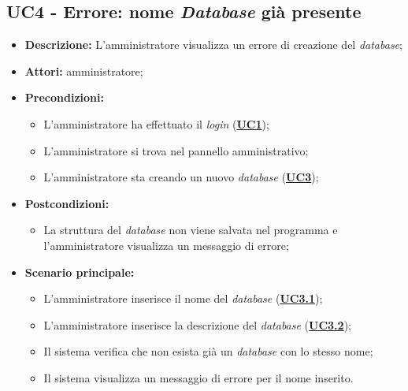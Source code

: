 \subsection{UC4 - Errore: nome \textit{Database} già presente}
\label{sec:UC4}
\begin{itemize}
	\item \textbf{Descrizione:} L’amministratore visualizza un errore di creazione del \textit{database};
	\item \textbf{Attori:} amministratore;
	\item \textbf{Precondizioni:} 
	\begin{itemize}
		\item L’amministratore ha effettuato il \textit{login} (\hyperref[sec:UC1]{\textbf{UC1}});
		\item L’amministratore si trova nel pannello amministrativo;
		\item L’amministratore sta creando un nuovo \textit{database} (\hyperref[sec:UC3]{\textbf{UC3}});
	\end{itemize}
	\item \textbf{Postcondizioni:} 
	\begin{itemize}
		\item La struttura del \textit{database} non viene salvata nel programma e l'amministratore visualizza un messaggio di errore;
	\end{itemize}
	\item \textbf{Scenario principale:} 
	\begin{itemize}
		\item L’amministratore inserisce il nome del \textit{database} (\hyperref[sec:UC3.1]{\textbf{UC3.1}});
		\item L’amministratore inserisce la descrizione del \textit{database}  (\hyperref[sec:UC3.2]{\textbf{UC3.2}});
		\item Il sistema verifica che non esista già un \textit{database} con lo stesso nome;
		\item Il sistema visualizza un messaggio di errore per il nome inserito.
	\end{itemize}
\end{itemize}

